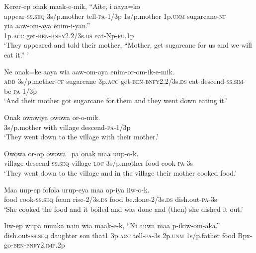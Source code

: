 {\ea\label{ex:a:x3}
\gll  Kerer-ep  onak  maak-e-mik,  “Aite,  i  aaya=ko \\
appear-\textsc{ss.seq}  3s/p.mother  tell-\textsc{pa}-1/3p  1s/p.mother  1p.\textsc{unm}  sugarcane-\textsc{nf} \\
yia  aaw-om-aya  enim-i-yan.” \\
1p.\textsc{acc}  get-\textsc{ben}-\textsc{bnfy}2.2/3s.\textsc{ds}  eat-Np-\textsc{fu}.1p \\
\glt ‘They appeared and told their mother, “Mother, get sugarcane for us and we will eat it.” ’ \\
\z


\ea\label{ex:a:x4}
\gll  Ne  onak=ke  aaya  wia  aaw-om-aya                       enim-or-om-ik-e-mik. \\
\textsc{add}  3s/p.mother-\textsc{cf}  sugarcane  3p.\textsc{acc}  get-\textsc{ben}-\textsc{bnfy}2.2/3s.\textsc{ds}  eat-descend-\textsc{ss}.\textsc{sim}-be-\textsc{pa}-1/3p \\


\glt ‘And their mother got sugarcane for them and they went down eating it.’ \\
\z


\ea\label{ex:a:x5}
\gll  Onak  owawiya  owowa  or-o-mik. \\
3s/p.mother  with  village  descend-\textsc{pa}-1/3p \\
\glt ‘They went down to the village with their mother.’ \\
\z


\ea\label{ex:a:x6}
\gll  Owowa  or-op  owowa=pa  onak  maa  uup-o-k. \\
village  descend-\textsc{ss.seq}  village-\textsc{loc}  3s/p.mother  food  cook-\textsc{pa}-3s \\
\glt ‘They went down to the village and in the village their mother cooked food.’ \\
\z


\ea\label{ex:a:x7}
\gll  Maa  uup-ep  fofola  urup-eya  maa  op-iya  iiw-o-k. \\
food  cook-\textsc{ss.seq}  foam  rise-2/3s.\textsc{ds}  food  be.done-2/3s.\textsc{ds}  dish.out-\textsc{pa}-3s \\
\glt ‘She cooked the food and it boiled and was done and (then) she dished it out.’ \\
\z


\ea\label{ex:a:x8}
\gll  Iiw-ep  wiipa  muuka  nain  wia  maak-e-k,  “Ni              auwa  maa  p-ikiw-om-aka.” \\
dish.out-\textsc{ss.seq}  daughter  son  that1  3p.\textsc{acc}  tell-\textsc{pa}-3s  2p.\textsc{unm}  1s/p.father  food  Bpx-go-\textsc{ben}-\textsc{bnfy}2.\textsc{imp}.2p \\


}
